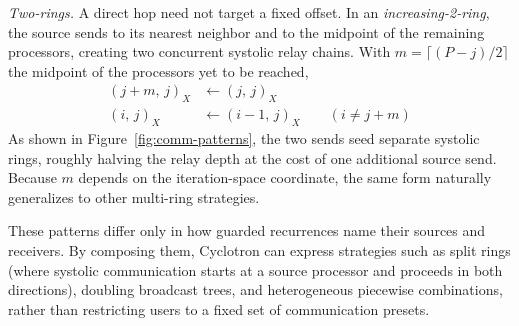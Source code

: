 \documentclass[sigplan, nonacm]{acmart}
\begin{document}






\emph{Two-rings.} A direct hop need not target a fixed offset. In
an \emph{increasing-2-ring}, the source sends to its nearest neighbor and to the midpoint of
the remaining processors, creating two concurrent systolic relay chains. With $m = \lceil (P - j)/2 \rceil$ the midpoint of the
processors yet to be reached,
%
\begin{align}
  (j{+}m,\,j)_{X} &\leftarrow (j,\,j)_{X} \\
  (i,\,j)_{X} &\leftarrow (i{-}1,\,j)_{X} \qquad (i \neq j{+}m)
\end{align}
%
As shown in Figure~\ref{fig:comm-patterns}, the two sends seed separate systolic rings, roughly halving the relay depth at the cost of one additional source send. Because \(m\) depends on the iteration-space coordinate, the same form naturally generalizes to other multi-ring strategies.


These patterns differ only in how guarded recurrences name their sources and receivers. By composing them, Cyclotron can express strategies such as split rings (where systolic communication starts at a source processor and proceeds in both directions), doubling broadcast trees, and heterogeneous piecewise combinations, rather than restricting users to a fixed set of communication presets.
\end{document}
